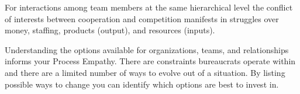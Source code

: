 For interactions among team members at the same hierarchical level the conflict of interests between cooperation and competition manifests in struggles over money, staffing, products (output), and resources (inputs). 





Understanding the options available for organizations, teams, and relationships informs your Process Empathy. There are constraints bureaucrats operate within and there are a limited number of ways to evolve out of a situation. By listing possible ways to change you can identify which options are best to invest in. 
%
